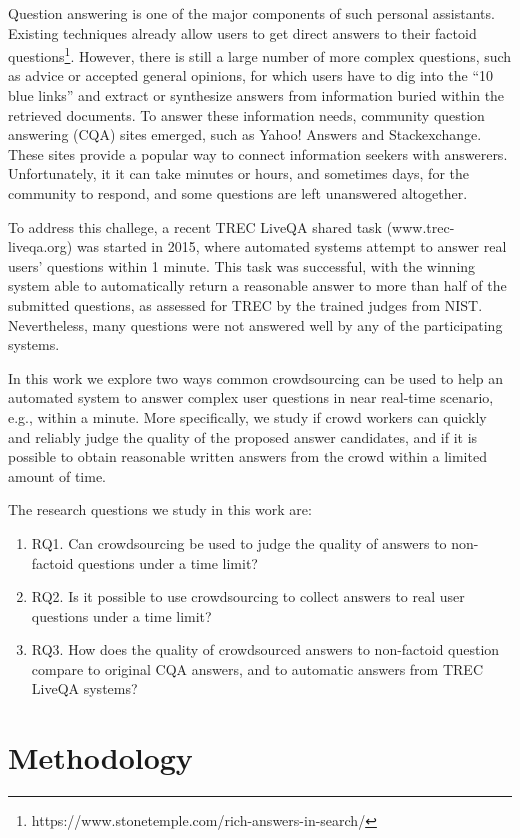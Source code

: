 \documentclass[11pt,letterpaper]{article}
\begin{document}
Question answering is one of the major components of such personal assistants.
Existing techniques already allow users to get direct answers to their factoid questions\footnote{https://www.stonetemple.com/rich-answers-in-search/}.
However, there is still a large number of more complex questions, such as advice or accepted general opinions, for which users have to dig into the ``10 blue links'' and extract or synthesize answers from information buried within the retrieved documents. To answer these information needs, community question answering (CQA) sites emerged, such as Yahoo! Answers and Stackexchange. These sites provide a popular way to connect information seekers with answerers. Unfortunately, it it can take minutes or hours, and sometimes days, for the community to respond, and some questions are left unanswered altogether. 

To address this challege, a recent TREC LiveQA shared task (www.trec-liveqa.org) was started in 2015, where automated systems attempt to answer real users' questions within 1 minute. This task was successful, with the winning system able to automatically return a reasonable answer to more than half of the submitted questions, as assessed for TREC by the trained judges from NIST. Nevertheless, many questions were not answered well by any of the participating systems.

In this work we explore two ways common crowdsourcing can be used to help an automated system to answer complex user questions in near real-time scenario, e.g., within a minute.
More specifically, we study if crowd workers can quickly and reliably judge the quality of the proposed answer candidates, and if it is possible to obtain reasonable written answers from the crowd within a limited amount of time.

The research questions we study in this work are:
\begin{enumerate}
\item RQ1. Can crowdsourcing be used to judge the quality of answers to non-factoid questions under a time limit?
\item RQ2. Is it possible to use crowdsourcing to collect answers to real user questions under a time limit?
\item RQ3. How does the quality of crowdsourced answers to non-factoid question compare to original CQA answers, and to automatic answers from TREC LiveQA systems?
\end{enumerate}


\section{Methodology}
\label{sec:methodology}
\end{document}
